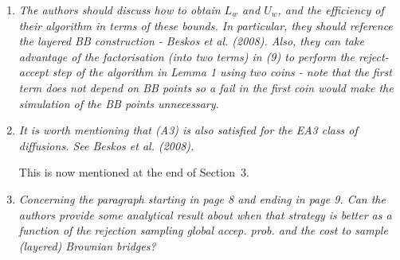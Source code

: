 \documentclass[12pt]{article}
\newcommand{\1}{\mathrm{1}}
\begin{document}
\begin{enumerate}
\item {\em The authors should discuss how to obtain $L_w$ and $U_w$, and the efficiency of their
algorithm in terms of these bounds. In particular, they should reference the layered
BB construction - Beskos et al. (2008). Also, they can take advantage of the factorisation (into two terms) in (9) to perform the reject-accept step of the algorithm
in Lemma 1 using two coins - note that the first term does not depend on BB points
so a fail in the first coin would make the simulation of the BB points unnecessary.}

\vspace{.3cm}

\item {\em It is worth mentioning that (A3) is also satisfied for the EA3 class of diffusions. See
Beskos et al. (2008).}

\vspace{.3cm}

This is now mentioned at the end of Section~3.

\item {\em Concerning the paragraph starting in page 8 and ending in page 9. Can the authors
provide some analytical result about when that strategy is better as a function of the
rejection sampling global accep. prob. and the cost to sample (layered) Brownian
bridges?}

\vspace{.3cm}


\end{enumerate}
\end{document}
